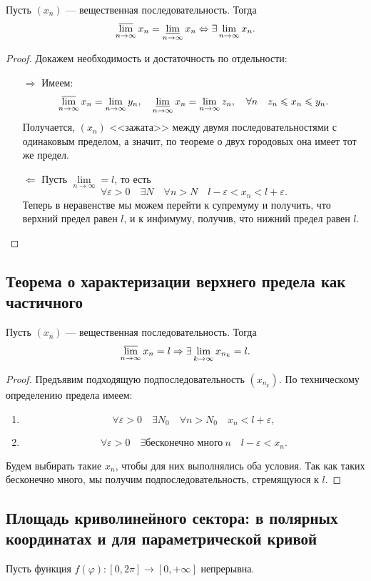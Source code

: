 \begin{theorem}
	Пусть \((x_n)\) --- вещественная последовательность. Тогда \[
		\varlimsup_{n \to \infty} x_n = \varliminf_{n \to \infty} x_n \Leftrightarrow \exists \lim_{n \to \infty} x_n.
	\]
\end{theorem}

\begin{proof}
	Докажем необходимость и достаточность по отдельности:
	\begin{enumerate}
		\item[\(\Rightarrow\)] Имеем: \[
			\varlimsup_{n \to \infty} x_n = \lim_{n \to \infty} y_n, \quad
			\varliminf_{n \to \infty} x_n = \lim_{n \to \infty} z_n, \quad
			\forall n \quad z_n \leqslant x_n \leqslant y_n.
		\]
		Получается, \((x_n)\) <<зажата>> между двумя последовательностями с одинаковым пределом, а значит, по теореме о двух городовых она имеет тот же предел.
		\item[\(\Leftarrow\)] Пусть \(\lim\limits_{n \to \infty} = l\), то есть \[
			\forall \varepsilon > 0 \quad \exists N \quad \forall n > N \quad l - \varepsilon < x_n < l + \varepsilon.
		\]
		Теперь в неравенстве мы можем перейти к супремуму и получить, что верхний предел равен \(l\), и к инфимуму, получив, что нижний предел равен \(l\). 
	\end{enumerate} 
\end{proof}

\subsection{Теорема о характеризации верхнего предела как частичного}

\begin{theorem}
	Пусть \((x_n)\) --- вещественная последовательность. Тогда \[
		\varlimsup_{n \to \infty} x_n = l \Rightarrow \exists \lim_{k \to \infty} x_{n_k} = l.
	\]
\end{theorem}

\begin{proof}
	Предъявим подходящую подпоследовательность \((x_{n_k})\). По техническому определению предела имеем:
	\begin{enumerate}
		\item \[
		\forall \varepsilon > 0 \quad \exists N_0 \quad \forall n > N_0 \quad x_n < l + \varepsilon,
		\]
		\item \[
		\forall \varepsilon > 0 \quad \exists \textit{бесконечно много} \ n \quad l - \varepsilon < x_n.
		\]
	\end{enumerate}
	Будем выбирать такие \(x_n\), чтобы для них выполнялись оба условия. Так как таких бесконечно много, мы получим подпоследовательность, стремящуюся к \(l\).
\end{proof}

\subsection{Площадь криволинейного сектора: в полярных координатах и для параметрической кривой}

\begin{theorem}
	Пусть функция \(f(\varphi) \colon [0, 2\pi] \to [0, +\infty]\) непрерывна.
\end{theorem}

